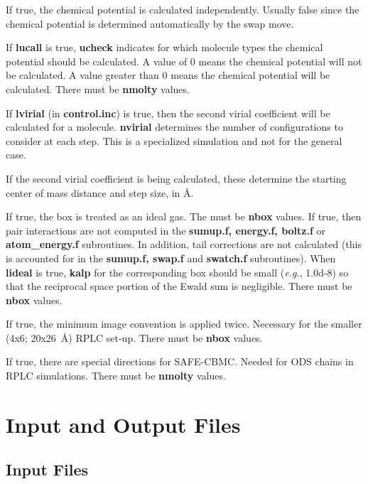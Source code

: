 \documentclass[12pt,letterpaper]{article}
\begin{document}
{{{{{{{ If true, the chemical potential is calculated independently.
Usually false since the chemical potential is determined automatically by the swap move.

 If {\textbf {lucall}} is true, {\textbf{ucheck}} indicates for which 
molecule types the chemical potential should be calculated.  A value of 0 means the chemical potential
will not be calculated.  A value greater than 0 means the chemical potential will be calculated.
There must be {\textbf{nmolty}} values.

 If {\textbf {lvirial}} (in {\textbf{control.inc}}) is true,
then the second virial coefficient will be calculated for a molecule.
{\textbf {nvirial}} determines the number of configurations to consider
at each step.  This is a specialized simulation and not for the
general case.

 If the second virial coefficient is being
calculated, these determine the starting center of mass distance and
step size, in {\AA}.

 If true, the box is treated as an ideal gas.  
The must be {\textbf{nbox}} values.  If true, then pair interactions are not computed
in the {\bf sumup.f, energy.f, boltz.f} or {\bf atom\_energy.f} subroutines.  In addition, tail corrections
are not calculated (this is accounted for in the {\bf sumup.f, swap.f} and {\bf swatch.f} subroutines).
When {\bf lideal} is true, {\bf kalp} for the corresponding box should be small ({\it e.g.}, 1.0d-8) so that
the reciprocal space portion of the Ewald sum is negligible.  There must be {\bf nbox} values.

 If true, the minimum image convention
is applied twice.  Necessary for the smaller (4x6; 20x26~{\AA})
RPLC set-up.  There must be {\textbf{nbox}} values.   

 If true, there are special directions for SAFE-CBMC.
Needed for ODS chains in RPLC simulations.
There must be {\textbf{nmolty}} values.

\section{Input and Output Files}

\subsection{Input Files}

}}}}}}}
\end{document}
